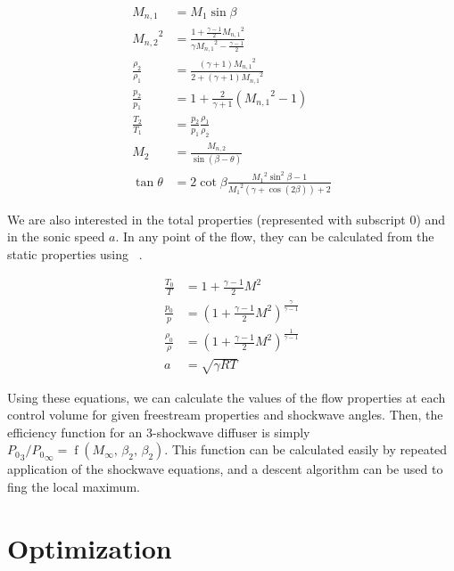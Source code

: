 \documentclass[12pt, openright, oneside, a4paper, english]{unbtex}
\begin{document}
\begin{align}
    \label{eq:shock_0}
    M_{n,1}               & = M_1 \sin\beta
    \\
    {M_{n,2}}^2           & = \frac{
        1 + \frac{\gamma - 1}{2} {M_{n,1}}^2
    }{
        \gamma {M_{n,1}}^2 - \frac{\gamma - 1}{2}
    }
    \\
    \frac{\rho_2}{\rho_1} & = \frac{ (\gamma + 1) {M_{n,1}}^2 }{ 2 + (\gamma + 1) {M_{n,1}}^2 }
    \\
    \frac{p_2}{p_1}       & = 1 + \frac{2}{\gamma + 1} ( {M_{n,1}}^2 - 1 )
    \\
    \frac{T_2}{T_1}       & = \frac{p_2}{p_1} \frac{\rho_1}{\rho_2}
    \\
    M_2                   & = \frac{M_{n,2}}{\sin(\beta - \theta)}
    \\
    \label{eq:shock_1}
    \tan\theta            & = 2 \cot\beta \frac{ {M_1}^2\sin^2\beta - 1 }{ {M_1}^2 (\gamma + \cos(2\beta)) + 2 }
\end{align}

We are also interested in the total properties (represented with subscript \(0\)) and in the sonic speed \(a\). In any point of the flow, they can be calculated from the static properties using ~\cite{anderson2017}.

\begin{align}
    \label{eq:static_0}
    \frac{T_0}{T}       & = 1 + \frac{\gamma - 1}{2}M^2
    \\
    \frac{p_0}{p}       & = \left( 1 + \frac{\gamma - 1}{2}M^2 \right) ^ {\frac{\gamma}{\gamma - 1}}
    \\
    \frac{\rho_0}{\rho} & = \left( 1 + \frac{\gamma - 1}{2}M^2 \right) ^ {\frac{1}{\gamma - 1}}
    \\
    \label{eq:static_1}
    a                   & = \sqrt{\gamma R T}
\end{align}

Using these equations, we can calculate the values of the flow properties at each control volume for given freestream properties and shockwave angles. Then, the efficiency function for an 3-shockwave diffuser is simply \({P_0}_3 / {P_0}_\infty = \operatorname{f}(M_\infty,\, \beta_2,\, \beta_2)\). This function can be calculated easily by repeated application of the shockwave equations, and a descent algorithm can be used to fing the local maximum.


\section{Optimization}
\end{document}
